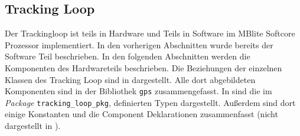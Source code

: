 \subsection{Tracking Loop}
Der Trackingloop ist teils in Hardware und Teils in Software im MBlite Softcore Prozessor implementiert. In den vorherigen Abschnitten wurde bereits der Software Teil beschrieben. In den folgenden Abschnitten werden die Komponenten des Hardwareteils beschrieben. Die Beziehungen der einzelnen Klassen des Tracking Loop sind in  dargestellt. Alle dort abgebildeten Komponenten sind in der Bibliothek \lstinline$gps$ zusammengefasst. In  sind die im \emph{Package} \lstinline$tracking_loop_pkg$, definierten Typen dargestellt. Außerdem sind dort einige Konstanten und die Component Deklarationen zusammenfasst (nicht dargestellt in ).













